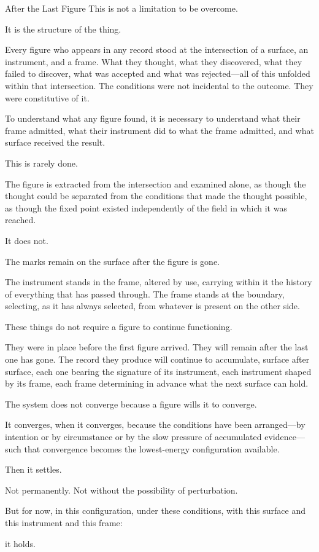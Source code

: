 \begin{interlude}{After the Last Figure}
This is not a limitation to be overcome.

It is the structure of the thing.

Every figure who appears in any record stood at the intersection
of a surface, an instrument, and a frame. What they thought, what
they discovered, what they failed to discover, what was accepted
and what was rejected---all of this unfolded within that
intersection. The conditions were not incidental to the outcome.
They were constitutive of it.

To understand what any figure found, it is necessary to understand
what their frame admitted, what their instrument did to what the
frame admitted, and what surface received the result.

This is rarely done.

The figure is extracted from the intersection and examined alone,
as though the thought could be separated from the conditions that
made the thought possible, as though the fixed point existed
independently of the field in which it was reached.

It does not.

\medskip

The marks remain on the surface after the figure is gone.

The instrument stands in the frame, altered by use, carrying
within it the history of everything that has passed through.
The frame stands at the boundary, selecting, as it has always
selected, from whatever is present on the other side.

These things do not require a figure to continue functioning.

They were in place before the first figure arrived. They will
remain after the last one has gone. The record they produce will
continue to accumulate, surface after surface, each one bearing
the signature of its instrument, each instrument shaped by its
frame, each frame determining in advance what the next surface
can hold.

The system does not converge because a figure wills it to converge.

It converges, when it converges, because the conditions have been
arranged---by intention or by circumstance or by the slow pressure
of accumulated evidence---such that convergence becomes the
lowest-energy configuration available.

Then it settles.

Not permanently. Not without the possibility of perturbation.

But for now, in this configuration, under these conditions, with
this surface and this instrument and this frame:

it holds.

\end{interlude}

